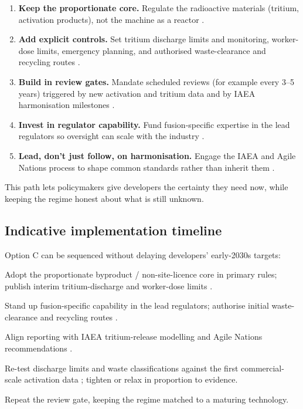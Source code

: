 \documentclass[11pt,a4paper]{article}
\begin{document}
\begin{enumerate}[leftmargin=1.5em]
  \item \textbf{Keep the proportionate core.} Regulate the radioactive materials
  (tritium, activation products), not the machine as a reactor
  \citep{nrc2026proposedrule,ukfusionregfactsheet}.
  \item \textbf{Add explicit controls.} Set tritium discharge limits and
  monitoring, worker-dose limits, emergency planning, and authorised
  waste-clearance and recycling routes \citep{iaeatritiumharmonization,radwasterecycling2023}.
  \item \textbf{Build in review gates.} Mandate scheduled reviews (for example
  every 3--5 years) triggered by new activation and tritium data and by IAEA
  harmonisation milestones \citep{iaea2023meeting,tritiumbreeding2018}.
  \item \textbf{Invest in regulator capability.} Fund fusion-specific expertise
  in the lead regulators so oversight can scale with the industry
  \citep{ukenvagency2022,sidmethodology2026}.
  \item \textbf{Lead, don't just follow, on harmonisation.} Engage the IAEA and
  Agile Nations process to shape common standards rather than inherit them
  \citep{agilenations2023}.
\end{enumerate}

This path lets policymakers give developers the certainty they need now, while
keeping the regime honest about what is still unknown.

\subsection{Indicative implementation timeline}
Option C can be sequenced without delaying developers' early-2030s targets:

\begin{description}[leftmargin=1.4em,style=nextline]
  \item[Year 0--1.] Adopt the proportionate byproduct / non-site-licence core in
  primary rules; publish interim tritium-discharge and worker-dose limits
  \citep{nrc2026proposedrule,ukfusionregfactsheet}.
  \item[Year 1--2.] Stand up fusion-specific capability in the lead regulators;
  authorise initial waste-clearance and recycling routes
  \citep{ukenvagency2022,radwasterecycling2023}.
  \item[Year 2--3.] Align reporting with IAEA tritium-release modelling and Agile
  Nations recommendations \citep{iaeatritiumharmonization,agilenations2023}.
  \item[Year 3--5 (first review gate).] Re-test discharge limits and waste
  classifications against the first commercial-scale activation data
  \citep{tritiumbreeding2018}; tighten or relax in proportion to evidence.
  \item[Every 3--5 years thereafter.] Repeat the review gate, keeping the regime
  matched to a maturing technology.
\end{description}
\end{document}
